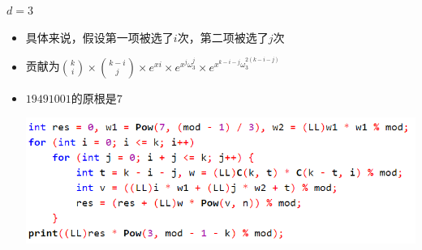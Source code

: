 \documentclass{beamer}
\begin{document}
\begin{frame}{$d = 3$}
    \begin{itemize}
        \item 具体来说，假设第一项被选了$i$次，第二项被选了$j$次 \pause
        \item 贡献为${k\choose i}\times {k - i\choose j}\times e^{xi}\times e^{x^j\omega_3^j}\times e^{x^{k - i - j}\omega_3^{2(k - i - j)}}$ \pause
        \item $19491001$的原根是$7$ \pause
        \begin{center}
            \includegraphics[scale=0.5]{2.png}
        \end{center}
    \end{itemize}
\end{frame} 
\end{document}
